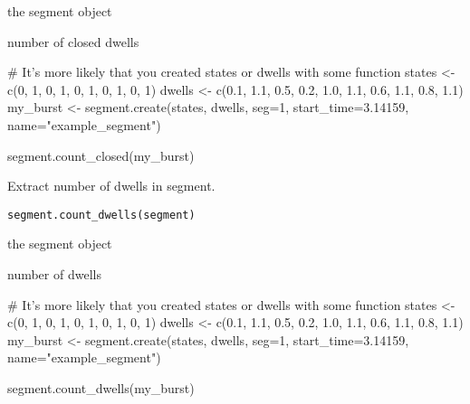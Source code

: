 \documentclass[letterpaper]{book}
\begin{document}
%
\begin{Arguments}
\begin{ldescription}
\item[\code{segment}] the segment object
\end{ldescription}
\end{Arguments}
%
\begin{Value}
number of closed dwells
\end{Value}
%
\begin{Examples}
\begin{ExampleCode}

# It's more likely that you created states or dwells with some function
states  <-  c(0,      1,    0,    1,    0,    1,    0,    1,    0,    1)
dwells  <-  c(0.1,  1.1,  0.5,  0.2,  1.0,  1.1,  0.6,  1.1,  0.8,  1.1)
my_burst <- segment.create(states, dwells, seg=1, start_time=3.14159, name="example_segment")

segment.count_closed(my_burst)

\end{ExampleCode}
\end{Examples}
%
\begin{Description}\relax
Extract number of dwells in segment.
\end{Description}
%
\begin{Usage}
\begin{verbatim}
segment.count_dwells(segment)
\end{verbatim}
\end{Usage}
%
\begin{Arguments}
\begin{ldescription}
\item[\code{segment}] the segment object
\end{ldescription}
\end{Arguments}
%
\begin{Value}
number of dwells
\end{Value}
%
\begin{Examples}
\begin{ExampleCode}

# It's more likely that you created states or dwells with some function
states  <-  c(0,      1,    0,    1,    0,    1,    0,    1,    0,    1)
dwells  <-  c(0.1,  1.1,  0.5,  0.2,  1.0,  1.1,  0.6,  1.1,  0.8,  1.1)
my_burst <- segment.create(states, dwells, seg=1, start_time=3.14159, name="example_segment")

segment.count_dwells(my_burst)

\end{ExampleCode}
\end{Examples}
\end{document}
